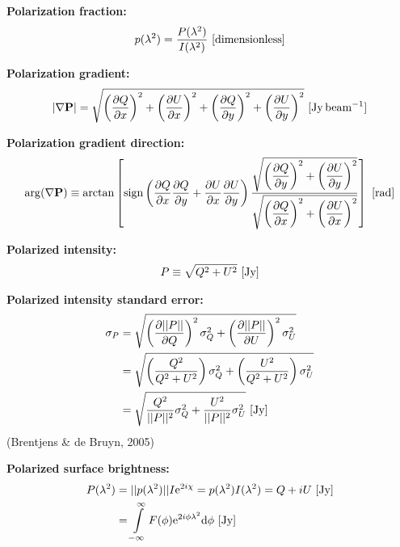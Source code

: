 \documentclass[a4paper,11pt]{article}
\begin{document}
{\noindent}\textbf{Polarization fraction:}
\begin{align*}
p(\lambda^2) = \dfrac{P(\lambda^2)}{I(\lambda^2)} ~ [{\rm dimensionless}]
\end{align*}

{\noindent}\textbf{Polarization gradient:}
\begin{align*}
    \lvert\nabla \mathbf{P}\rvert = \sqrt{\left(\frac{\partial Q}{\partial x}\right)^2 + \left(\frac{\partial U}{\partial x}\right)^2 + \left(\frac{\partial Q}{\partial y}\right)^2 + \left(\frac{\partial U}{\partial y}\right)^2} ~ [\rm Jy\,beam^{-1}]
\end{align*}

{\noindent}\textbf{Polarization gradient direction:}
\begin{align*}
    \mathrm{arg}(\nabla\mathbf{P}) \equiv \arctan \left[ \mathrm{sign} \left(\dfrac{\partial Q}{\partial x}\dfrac{\partial Q}{\partial y} + \dfrac{\partial U}{\partial x}\dfrac{\partial U}{\partial y}\right) \dfrac{\sqrt{\left(\dfrac{\partial Q}{\partial y}\right)^2 + \left(\dfrac{\partial U}{\partial y}\right)^2}}{\sqrt{\left(\dfrac{\partial Q}{\partial x}\right)^2 + \left(\dfrac{\partial U}{\partial x}\right)^2}} \right] ~ [\rm rad]
\end{align*}

{\noindent}\textbf{Polarized intensity:}
\begin{align*}
    P\equiv\sqrt{Q^2+U^2} ~ [\rm Jy]
\end{align*}

{\noindent}\textbf{Polarized intensity standard error:}
\begin{align*}
\sigma_P &= \sqrt{ \left(\dfrac{\partial\lvert\lvert P \rvert\rvert}{\partial Q}\right)^2\sigma_Q^2 + \left(\dfrac{\partial\lvert\lvert P \rvert\rvert}{\partial U}\right)^2\sigma_U^2 } \\
&= \sqrt{ \left(\dfrac{Q^2}{Q^2+U^2}\right)\sigma_Q^2 + \left(\dfrac{U^2}{Q^2+U^2}\right)\sigma_U^2 } \\
&= \sqrt{ \dfrac{Q^2}{\lvert\lvert P \rvert\rvert^2}\sigma_Q^2 + \dfrac{U^2}{\lvert\lvert P \rvert\rvert^2}\sigma_U^2 } ~ [\rm Jy]
\end{align*}
(Brentjens \& de Bruyn, 2005)

{\noindent}\textbf{Polarized surface brightness:}
\begin{align*}
P(\lambda^2) &= \lvert\lvert p(\lambda^2) \rvert\rvert I\mathrm{e}^{2i\chi} = p(\lambda^2)I(\lambda^2) = Q+iU ~ [\rm Jy] \\
&= \int\limits_{-\infty}^\infty F(\phi)\mathrm{e}^{2i\phi\lambda^2}\mathrm{d}\phi ~ [\rm Jy]
\end{align*}
\end{document}
